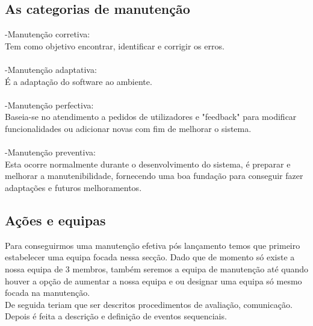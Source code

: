 \subsection{As categorias de manutenção}
-Manutenção corretiva:\\
Tem como objetivo encontrar, identificar e corrigir os erros.\\
\\-Manutenção adaptativa:\\
É a adaptação do software ao ambiente.\\
\\-Manutenção perfectiva:\\
Baseia-se no atendimento a pedidos de utilizadores e "feedback" para modificar funcionalidades ou adicionar novas com fim de melhorar o sistema.\\
\\-Manutenção preventiva:\\
Esta ocorre normalmente durante o desenvolvimento do sistema, é preparar e melhorar a manutenibilidade, fornecendo uma boa fundação para conseguir fazer adaptações e futuros melhoramentos.

\subsection{Ações e equipas}
Para conseguirmos uma manutenção efetiva pós lançamento temos que primeiro estabelecer uma equipa focada nessa secção. Dado que de momento só existe a nossa equipa de 3 membros, também seremos a equipa de manutenção até quando houver a opção de aumentar a nossa equipa e ou designar uma equipa só mesmo focada na manutenção.\\
De seguida teriam que ser descritos procedimentos de avaliação, comunicação.\\
Depois é feita a descrição e definição de eventos sequenciais.\\

